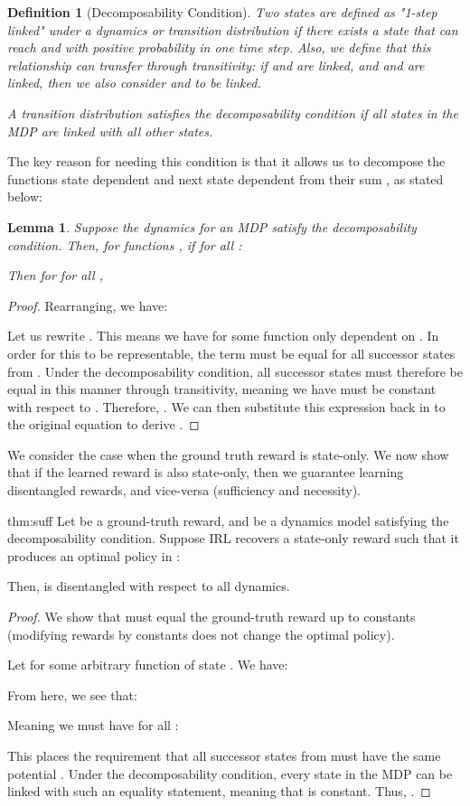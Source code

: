 \documentclass{article} \usepackage{iclr2018_conference,times}
\newtheorem{definition}{Definition}[section]
\newtheorem{lemma}{Lemma}[section]
\begin{document}
\begin{definition}[Decomposability Condition]
Two states  are defined as "1-step linked" under a dynamics or transition distribution  if there exists a state  that can reach  and  with positive probability in one time step. Also, we define that this relationship can transfer through transitivity: if  and  are linked, and  and  are linked, then we also consider  and  to be linked.

A transition distribution  satisfies the decomposability condition if all states in the MDP are linked with all other states.
\end{definition}

The key reason for needing this condition is that it allows us to decompose the functions state dependent  and next state dependent  from their sum , as stated below:

\begin{lemma}
\label{lem:chaining}
Suppose the dynamics for an MDP satisfy the decomposability condition. Then, for functions , if for all :

Then for for all ,


\end{lemma}
\begin{proof}
Rearranging, we have:


Let us rewrite . This means we have  for some function only dependent on . In order for this to be representable, the term  must be equal for all successor states  from . Under the decomposability condition, all successor states must therefore be equal in this manner through transitivity, meaning we have  must be constant with respect to . Therefore, . We can then substitute this expression back in to the original equation to derive .
\end{proof}

We consider the case when the ground truth reward is state-only. We now show that if the learned reward is also state-only, then we guarantee learning disentangled rewards, and vice-versa (sufficiency and necessity).
\begin{reptheorem}{thm:suff}
Let  be a ground-truth reward, and  be a dynamics model satisfying the decomposability condition. Suppose IRL recovers a state-only reward  such that it produces an optimal policy in :

Then,  is disentangled with respect to all dynamics.
\end{reptheorem}
\begin{proof}
We show that  must equal the ground-truth reward up to constants (modifying rewards by constants does not change the optimal policy). 

Let  for some arbitrary function of state . We have:





From here, we see that:

Meaning we must have for all :


This places the requirement that all successor states from  must have the same potential . Under the decomposability condition, every state in the MDP can be linked with such an equality statement, meaning that  is constant. Thus, .
\end{proof}
\end{document}
